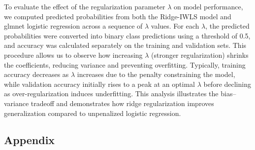 \documentclass[12pt,halfline,a4paper,]{ouparticle}
\begin{document}
To evaluate the effect of the regularization parameter \(\lambda\) on
model performance, we computed predicted probabilities from both the
Ridge-IWLS model and glmnet logistic regression across a sequence of
\(\lambda\) values. For each \(\lambda\), the predicted probabilities
were converted into binary class predictions using a threshold of 0.5,
and accuracy was calculated separately on the training and validation
sets. This procedure allows us to observe how increasing \(\lambda\)
(stronger regularization) shrinks the coefficients, reducing variance
and preventing overfitting. Typically, training accuracy decreases as
\(\lambda\) increases due to the penalty constraining the model, while
validation accuracy initially rises to a peak at an optimal \(\lambda\)
before declining as over-regularization induces underfitting. This
analysis illustrates the bias--variance tradeoff and demonstrates how
ridge regularization improves generalization compared to unpenalized
logistic regression.

\subsection{Appendix}\label{appendix}
\end{document}
